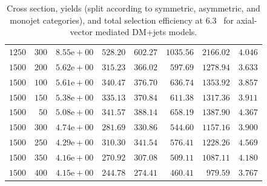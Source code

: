 \begin{table}
{\begin{tabular}{rrlrrrrr}
    $1250$ & $300$ & $8.55\text{e}+00$ & $528.20$ & $602.27$ & $1035.56$ & $2166.02$ & $4.046$ \\
    $1500$ & $200$ & $5.62\text{e}+00$ & $315.23$ & $366.02$ & $597.69$ & $1278.94$ & $3.633$ \\
    $1500$ & $100$ & $5.61\text{e}+00$ & $340.47$ & $376.70$ & $636.74$ & $1353.92$ & $3.857$ \\
    $1500$ & $150$ & $5.38\text{e}+00$ & $335.13$ & $370.84$ & $611.38$ & $1317.36$ & $3.911$ \\
    $1500$ & $50$ & $5.08\text{e}+00$ & $341.57$ & $388.14$ & $658.19$ & $1387.90$ & $4.367$ \\
    $1500$ & $300$ & $4.74\text{e}+00$ & $281.69$ & $330.86$ & $544.60$ & $1157.16$ & $3.900$ \\
    $1500$ & $250$ & $4.29\text{e}+00$ & $310.30$ & $341.54$ & $576.41$ & $1228.26$ & $4.569$ \\
    $1500$ & $350$ & $4.16\text{e}+00$ & $270.92$ & $307.08$ & $509.11$ & $1087.11$ & $4.180$ \\
    $1500$ & $400$ & $4.15\text{e}+00$ & $244.78$ & $274.41$ & $460.41$ & $979.59$ & $3.767$ \\
    \hline\hline
    \end{tabular}
    }
    \caption{Cross section, yields (split according to symmetric, asymmetric, 
        and monojet categories), and total selection efficiency at $6.3$~\ifb 
        for axial-vector mediated DM+jets models.}
    \label{tab:DMAV_yld}
\end{table}

